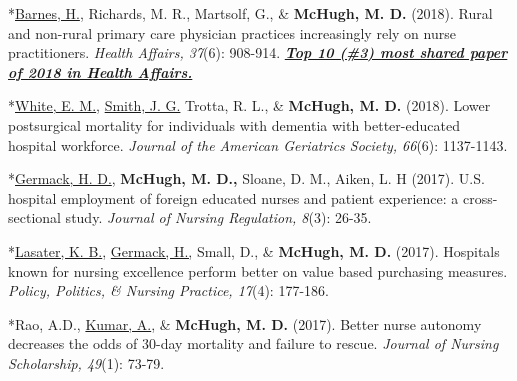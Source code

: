 \documentclass[10pt,]{article}
\begin{document}
{{{{{{{{{{{{{{\begin{hangparas}{.25in}{1}
*{\underline {Barnes, H.}}, Richards, M. R., Martsolf, G., \& {\textbf {McHugh, M. D.}} (2018). Rural and non-rural primary care physician practices increasingly rely on nurse practitioners. {\textit {Health Affairs, 37}}(6): 908-914. {\textit {\textbf {\underline {Top 10 (\#3) most shared paper of 2018 in Health Affairs.}}}}

\end{hangparas}

\vspace{4mm}

\begin{hangparas}{.25in}{1}

*{\underline {White, E. M.}}, {\underline {Smith, J. G.}} Trotta, R. L., \& {\textbf {McHugh, M. D.}} (2018). Lower postsurgical mortality for individuals with dementia with better-educated hospital workforce. {\textit {Journal of the American Geriatrics Society, 66}}(6): 1137-1143.

\end{hangparas}

\vspace{4mm}

\begin{hangparas}{.25in}{1}

*{\underline {Germack, H. D.}}, {\textbf {McHugh, M. D.,}} Sloane, D. M., Aiken, L. H (2017). U.S. hospital employment of foreign educated nurses and patient experience: a cross-sectional study. {\textit {Journal of Nursing Regulation, 8}}(3): 26-35.

\end{hangparas}

\vspace{4mm}

\begin{hangparas}{.25in}{1}

*{\underline {Lasater, K. B.}}, {\underline {Germack, H.,}} Small, D., \& {\textbf {McHugh, M. D.}} (2017). Hospitals known for nursing excellence perform better on value based purchasing measures. {\textit {Policy, Politics, \& Nursing Practice, 17}}(4): 177-186.

\end{hangparas}

\vspace{4mm}

\begin{hangparas}{.25in}{1}

*Rao, A.D., {\underline {Kumar, A.}}, \& {\textbf {McHugh, M. D.}} (2017). Better nurse autonomy decreases the odds of 30-day mortality and failure to rescue. {\textit {Journal of Nursing Scholarship, 49}}(1): 73-79.


\end{hangparas}}}}}}}}}}}}}}}
\end{document}
